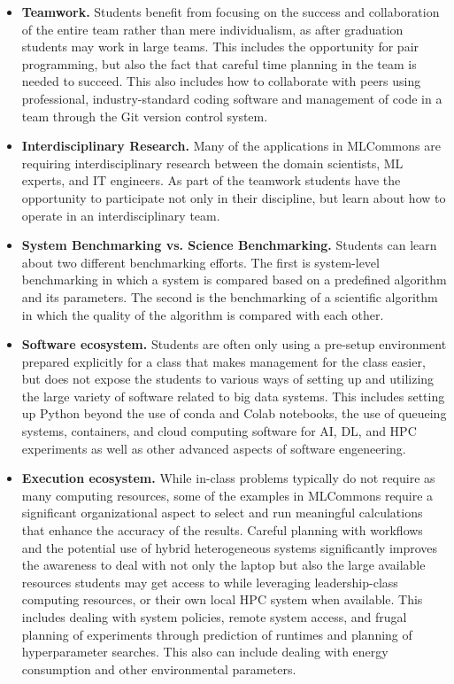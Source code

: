 \documentclass[utf8]{FrontiersinVancouver} %
\begin{document}
\begin{itemize}


  \item {\bf Teamwork.} Students benefit from focusing on the success
    and collaboration of the entire team rather than mere
    individualism, as after graduation students may work in large
    teams. This includes the opportunity for pair programming, but also
    the fact that careful time planning in the team is needed to
    succeed.  This also includes how to collaborate with peers using
    professional, industry-standard coding software and management of
    code in a team through the Git version control system.

  \item {\bf Interdisciplinary Research.} Many of the applications in
    MLCommons are requiring interdisciplinary research between the domain
    scientists, ML experts, and IT engineers. As part of the teamwork
    students have the opportunity to participate not only in their
    discipline, but learn about how to operate in an interdisciplinary
    team.

  \item {\bf System Benchmarking vs. Science Benchmarking.} Students
    can learn about two different benchmarking efforts. The first is
    system-level benchmarking in which a system is compared based
    on a predefined algorithm and its parameters. The second is the
    benchmarking of a scientific algorithm in which the quality of the
    algorithm is compared with each other.

  \item {\bf Software ecosystem.} Students are often only using a
    pre-setup environment prepared explicitly for a class that makes
    management for the class easier, but does not expose the students
    to various ways of setting up and utilizing the large variety of
    software related to big data systems. This includes setting up
    Python beyond the use of conda and Colab notebooks, the use of
    queueing systems, containers, and cloud computing software for
    AI, DL, and HPC experiments as well as other advanced aspects of
    software engeneering.

  \item {\bf Execution ecosystem.} While in-class problems typically
    do not require as many computing resources, some of the examples in
    MLCommons require a significant organizational aspect to select
    and run meaningful calculations that enhance the accuracy of the
    results. Careful planning with workflows and the potential use
    of hybrid heterogeneous systems significantly improves the
    awareness to deal with not only the laptop but also the large
    available resources students may get access to while leveraging
    leadership-class computing resources, or their own local HPC
    system when available. This includes dealing with system policies,
    remote system access, and frugal planning of experiments through
    prediction of runtimes and planning of hyperparameter searches. This
    also can include dealing with energy consumption and other
    environmental parameters.


\end{itemize}
\end{document}
